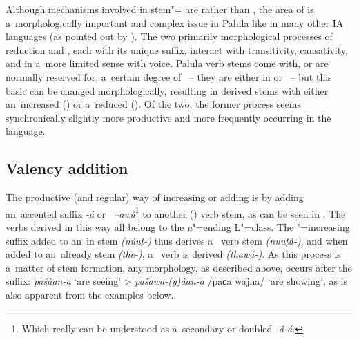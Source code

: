 Although mechanisms involved in stem"= are  rather than , the area of  is a~morphologically important and complex issue in Palula like in many other IA languages (as pointed out by \citealt[315]{masica1991}). The two primarily morphological processes of  reduction and , each with its unique suffix, interact with transitivity, causativity, and in a~more limited sense with voice. Palula verb stems come with, or are normally reserved for, a~certain degree of ~-- they are either in or ~-- but this basic  can be changed morphologically, resulting in derived stems with either an~increased  () or a~reduced  (). Of the two, the former process seems synchronically slightly more productive and more frequently occurring in the language.


\subsection{Valency addition}
\label{subsec:8-5-1}

The productive (and regular) way of increasing or adding  is by adding an~accented suffix
\textit{-á} or \textit{~--awá}\footnote{Which really can be understood as a~secondary or
  doubled  \textit{-á-á}.} to another () verb stem, as can be seen in
. The verbs derived in this way all belong to the \textit{a}"=ending L"=class. The "=increasing suffix added to an~in  stem \mbox{\textit{(núuṭ-)}} thus derives a~  verb stem \textit{(nuuṭá-)}, and when added to an~already  stem \textit{(the-)}, a~ verb is derived \textit{(thawá-)}. As this process is a~matter of stem formation, any  morphology, as described above, occurs after the  suffix: \textit{pašáan-a} `are seeing' {\textgreater} \textit{pašawa-(y)áan-a} /paɕaˈwajna/ `are showing', as is also apparent from the examples below.


